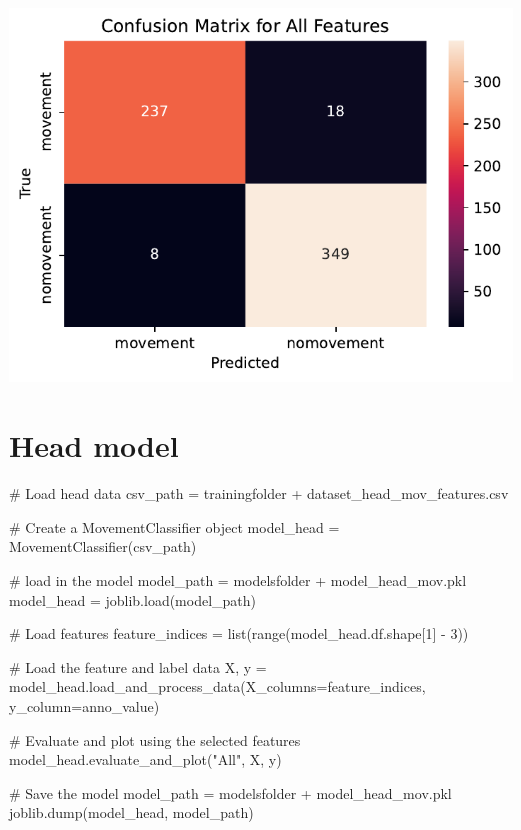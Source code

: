 \documentclass[
  letterpaper,
  DIV=11,
  numbers=noendperiod]{scrreprt}
\newenvironment{Shaded}{\begin{snugshade}}{\end{snugshade}}
\newcommand{\BuiltInTok}[1]{\textcolor[rgb]{0.00,0.23,0.31}{#1}}
\newcommand{\CommentTok}[1]{\textcolor[rgb]{0.37,0.37,0.37}{#1}}
\newcommand{\DecValTok}[1]{\textcolor[rgb]{0.68,0.00,0.00}{#1}}
\newcommand{\NormalTok}[1]{\textcolor[rgb]{0.00,0.23,0.31}{#1}}
\newcommand{\OperatorTok}[1]{\textcolor[rgb]{0.37,0.37,0.37}{#1}}
\newcommand{\StringTok}[1]{\textcolor[rgb]{0.13,0.47,0.30}{#1}}
\begin{document}
\includegraphics{04_TS_movementAnnotation/02_MovementClassifier_final_files/figure-pdf/cell-4-output-2.pdf}

\section{Head model}\label{head-model}

\begin{Shaded}
\begin{Highlighting}[]
\CommentTok{\# Load head data}
\NormalTok{csv\_path }\OperatorTok{=}\NormalTok{ trainingfolder }\OperatorTok{+} \StringTok{\textquotesingle{}dataset\_head\_mov\_features.csv\textquotesingle{}}

\CommentTok{\# Create a MovementClassifier object}
\NormalTok{model\_head }\OperatorTok{=}\NormalTok{ MovementClassifier(csv\_path)}

\CommentTok{\# load in the model}
\NormalTok{model\_path }\OperatorTok{=}\NormalTok{ modelsfolder }\OperatorTok{+} \StringTok{\textquotesingle{}model\_head\_mov.pkl\textquotesingle{}}
\NormalTok{model\_head }\OperatorTok{=}\NormalTok{ joblib.load(model\_path)}

\CommentTok{\# Load features}
\NormalTok{feature\_indices }\OperatorTok{=} \BuiltInTok{list}\NormalTok{(}\BuiltInTok{range}\NormalTok{(model\_head.df.shape[}\DecValTok{1}\NormalTok{] }\OperatorTok{{-}} \DecValTok{3}\NormalTok{))}

\CommentTok{\# Load the feature and label data}
\NormalTok{X, y }\OperatorTok{=}\NormalTok{ model\_head.load\_and\_process\_data(X\_columns}\OperatorTok{=}\NormalTok{feature\_indices, y\_column}\OperatorTok{=}\StringTok{\textquotesingle{}anno\_value\textquotesingle{}}\NormalTok{)}

\CommentTok{\# Evaluate and plot using the selected features}
\NormalTok{model\_head.evaluate\_and\_plot(}\StringTok{"All"}\NormalTok{, X, y)}

\CommentTok{\# Save the model}
\NormalTok{model\_path }\OperatorTok{=}\NormalTok{ modelsfolder }\OperatorTok{+} \StringTok{\textquotesingle{}model\_head\_mov.pkl\textquotesingle{}}
\NormalTok{joblib.dump(model\_head, model\_path)}
\end{Highlighting}
\end{Shaded}
\end{document}
